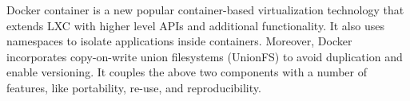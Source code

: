 Docker container is a new popular container-based virtualization technology that extends LXC with higher level APIs and additional functionality. It also uses namespaces to isolate applications inside containers. Moreover, Docker incorporates copy-on-write union filesystems (UnionFS) to avoid duplication and enable versioning. It couples the above two components with a number of features, like portability, re-use, and reproducibility.



 
 
 

